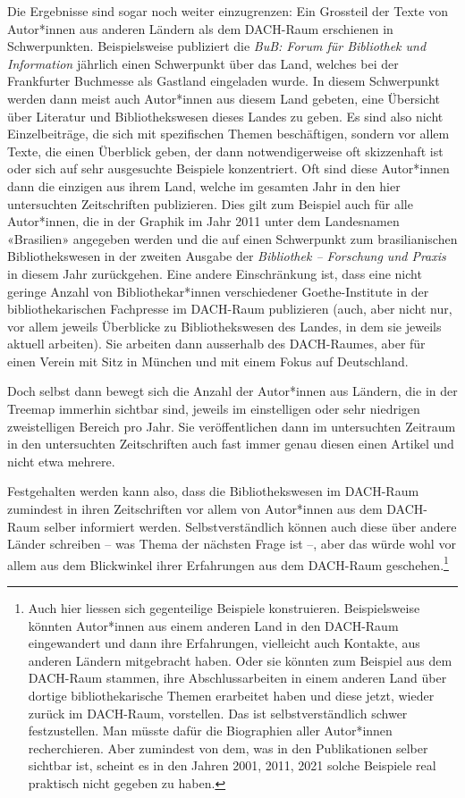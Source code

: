 \documentclass[a4paper,
fontsize=11pt,
oneside,
numbers=noperiodatend,
parskip=half-,
bibliography=totoc,
final
]{scrartcl}
\begin{document}
Die Ergebnisse sind sogar noch weiter einzugrenzen: Ein Grossteil der
Texte von Autor*innen aus anderen Ländern als dem DACH-Raum erschienen
in Schwerpunkten. Beispielsweise publiziert die \emph{BuB: Forum für
Bibliothek und Information} jährlich einen Schwerpunkt über das Land,
welches bei der Frankfurter Buchmesse als Gastland eingeladen wurde. In
diesem Schwerpunkt werden dann meist auch Autor*innen aus diesem Land
gebeten, eine Übersicht über Literatur und Bibliothekswesen dieses
Landes zu geben. Es sind also nicht Einzelbeiträge, die sich mit
spezifischen Themen beschäftigen, sondern vor allem Texte, die einen
Überblick geben, der dann notwendigerweise oft skizzenhaft ist oder sich
auf sehr ausgesuchte Beispiele konzentriert. Oft sind diese Autor*innen
dann die einzigen aus ihrem Land, welche im gesamten Jahr in den hier
untersuchten Zeitschriften publizieren. Dies gilt zum Beispiel auch für
alle Autor*innen, die in der Graphik im Jahr 2011 unter dem Landesnamen
«Brasilien» angegeben werden und die auf einen Schwerpunkt zum
brasilianischen Bibliothekswesen in der zweiten Ausgabe der
\emph{Bibliothek -- Forschung und Praxis} in diesem Jahr zurückgehen.
Eine andere Einschränkung ist, dass eine nicht geringe Anzahl von
Bibliothekar*innen verschiedener Goethe-Institute in der
bibliothekarischen Fachpresse im DACH-Raum publizieren (auch, aber nicht
nur, vor allem jeweils Überblicke zu Bibliothekswesen des Landes, in dem
sie jeweils aktuell arbeiten). Sie arbeiten dann ausserhalb des
DACH-Raumes, aber für einen Verein mit Sitz in München und mit einem
Fokus auf Deutschland.

Doch selbst dann bewegt sich die Anzahl der Autor*innen aus Ländern, die
in der Treemap immerhin sichtbar sind, jeweils im einstelligen oder sehr
niedrigen zweistelligen Bereich pro Jahr. Sie veröffentlichen dann im
untersuchten Zeitraum in den untersuchten Zeitschriften auch fast immer
genau diesen einen Artikel und nicht etwa mehrere.

Festgehalten werden kann also, dass die Bibliothekswesen im DACH-Raum
zumindest in ihren Zeitschriften vor allem von Autor*innen aus dem
DACH-Raum selber informiert werden. Selbstverständlich können auch diese
über andere Länder schreiben -- was Thema der nächsten Frage ist --,
aber das würde wohl vor allem aus dem Blickwinkel ihrer Erfahrungen aus
dem DACH-Raum geschehen.\footnote{Auch hier liessen sich gegenteilige
  Beispiele konstruieren. Beispielsweise könnten Autor*innen aus einem
  anderen Land in den DACH-Raum eingewandert und dann ihre Erfahrungen,
  vielleicht auch Kontakte, aus anderen Ländern mitgebracht haben. Oder
  sie könnten zum Beispiel aus dem DACH-Raum stammen, ihre
  Abschlussarbeiten in einem anderen Land über dortige bibliothekarische
  Themen erarbeitet haben und diese jetzt, wieder zurück im DACH-Raum,
  vorstellen. Das ist selbstverständlich schwer festzustellen. Man
  müsste dafür die Biographien aller Autor*innen recherchieren. Aber
  zumindest von dem, was in den Publikationen selber sichtbar ist,
  scheint es in den Jahren 2001, 2011, 2021 solche Beispiele real
  praktisch nicht gegeben zu haben.}
\end{document}
